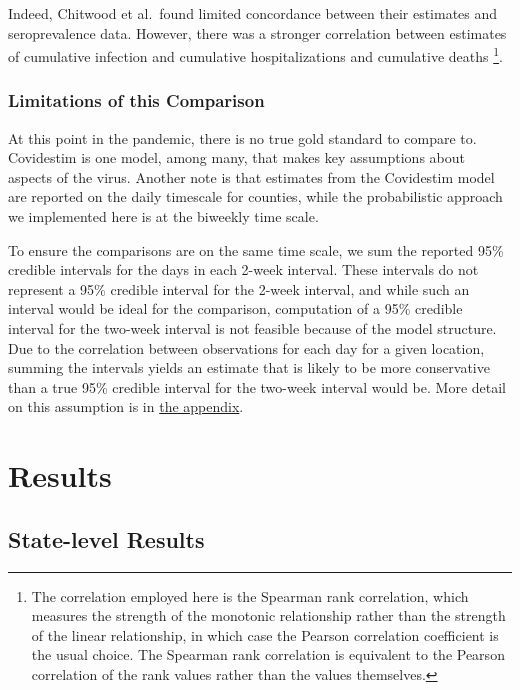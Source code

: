 \documentclass[12pt,twoside]{smiththesis}
\begin{document}
Indeed, Chitwood et al.~found limited concordance between their estimates and seroprevalence data. However, there was a stronger correlation between estimates of cumulative infection and cumulative hospitalizations and cumulative deaths \footnote{The correlation employed here is the Spearman rank correlation, which measures the strength of the monotonic relationship rather than the strength of the linear relationship, in which case the Pearson correlation coefficient is the usual choice. The Spearman rank correlation is equivalent to the Pearson correlation of the rank values rather than the values themselves. }.

\hypertarget{lims}{%
\subsection{Limitations of this Comparison}\label{lims}}

At this point in the pandemic, there is no true gold standard to compare to. Covidestim is one model, among many, that makes key assumptions about aspects of the virus. Another note is that estimates from the Covidestim model are reported on the daily timescale for counties, while the probabilistic approach we implemented here is at the biweekly time scale.

To ensure the comparisons are on the same time scale, we sum the reported 95\% credible intervals for the days in each 2-week interval. These intervals do not represent a 95\% credible interval for the 2-week interval, and while such an interval would be ideal for the comparison, computation of a 95\% credible interval for the two-week interval is not feasible because of the model structure. Due to the correlation between observations for each day for a given location, summing the intervals yields an estimate that is likely to be more conservative than a true 95\% credible interval for the two-week interval would be. More detail on this assumption is in \protect\hyperlink{conservativeintervals}{the appendix}.

\hypertarget{res}{%
\chapter{Results}\label{res}}

\hypertarget{state-level-results}{%
\section{State-level Results}\label{state-level-results}}
\end{document}
